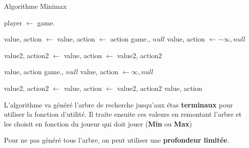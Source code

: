 \begin{algorithm}[H]
    \caption{Algorithme Minimax}\label{alg:minimax}
    \begin{algorithmic}
        \State player $\leftarrow$ game.
        
            \State value, action $\leftarrow$  
        \Else 
            \State value, action $\leftarrow$ 
        \EndIf
        \State \Return action
        \EndFunction
        \vspace{0.5cm}
            \State \Return game., $null$
        \EndIf 
        \State value, action $\leftarrow -\infty, null$

            \State value2, action2 $\leftarrow$ 
                \State value, action $\leftarrow$ value2, action2
            \EndIf
        \EndFor

        \Return value, action
        \EndFunction
        \vspace{0.5cm}
            \State \Return game., $null$
        \EndIf 
        \State value, action $\leftarrow \infty, null$ 

        \State value2, action2 $\leftarrow$ %
                \State value, action $\leftarrow$ value2, action2 
            \EndIf
        \EndFor
        \State \Return value, action
        \EndFunction
    \end{algorithmic} 
\end{algorithm}

L'algorithme va généré l'arbre de recherche jusqu'aux étas \textbf{terminaux} pour utiliser la fonction d'utilité. 
Il traite ensuite ces valeurs en remontant l'arbre et les choisit en fonction du joueur qui doit jouer (\textbf{Min} ou \textbf{Max})
\begin{note}
    Pour ne pas généré tous l'arbre, on peut utiliser une \textbf{profondeur limitée}.
\end{note}

